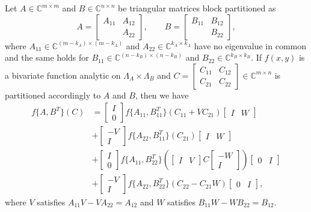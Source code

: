\documentclass{siamart1116}
\begin{document}
\begin{theorem}\label{thm:splitting}
	Let $A\in\mathbb C^{m\times m}$ and $B\in\mathbb C^{n\times n}$ be  triangular matrices block partitioned as
	$$
	A=\begin{bmatrix}
	A_{11}& A_{12}\\
	& A_{22}
	\end{bmatrix}
	,\qquad B=\begin{bmatrix}
	B_{11}& B_{12}\\
	& B_{22}
	\end{bmatrix}, $$
	where $A_{11}\in\mathbb C^{(m-k_A)\times (m-k_A)}$ and  $A_{22}\in\mathbb C^{k_A\times k_A}$ have no eigenvalue in common and the same holds for $B_{11}\in\mathbb C^{(n-k_B)\times (n-k_B)}$ and  $B_{22}\in\mathbb C^{k_B\times k_B}$. 
	If $f(x,y)$ is a bivariate function analytic on $\Lambda_A\times\Lambda_B$ and $C=\begin{bmatrix}
	C_{11}&C_{12}\\ C_{21}&C_{22}
	\end{bmatrix}\in\mathbb C^{m\times n}$ is partitioned accordingly to $A$ and $B$, then we have
	\begin{align*}
	f\{A,B^T\}(C)&=\begin{bmatrix}
	I \\ 0
	\end{bmatrix}
	f\{A_{11},B_{11}^T\}\left(C_{11}+V C_{21}\right)\begin{bmatrix}
	I&W
	\end{bmatrix}\\
	&+\begin{bmatrix}
	-V\\ I
	\end{bmatrix}f\{A_{22},B_{11}^T\}\left(C_{21}\right)\begin{bmatrix}
	I& W
	\end{bmatrix}\\
	&+\begin{bmatrix}
	I \\ 0
	\end{bmatrix}f\{A_{11},B_{22}^T\}\left(\begin{bmatrix}
	I& V
	\end{bmatrix}C \begin{bmatrix}
	-W\\ I
	\end{bmatrix}\right) \begin{bmatrix}
	0 & I
	\end{bmatrix}\\
	&+\begin{bmatrix}
	-V\\ I
	\end{bmatrix} f\{A_{22},B_{22}^T\}\left(C_{22}-C_{21}W\right)
	\begin{bmatrix}
	0& I
	\end{bmatrix},
	\end{align*}
	where $V$ satisfies $A_{11}V-VA_{22}=A_{12}$ and  $W$ satisfies $B_{11}W-WB_{22}=B_{12}$.
\end{theorem}
\end{document}

